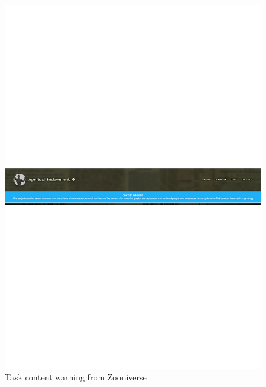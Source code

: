\begin{figure}
  \centering
  \includegraphics[width=\linewidth]{figures/warning_zooniverse.pdf}
  \caption{Task content warning from Zooniverse}
  \label{fig:zooniverse_removed}
\end{figure}

